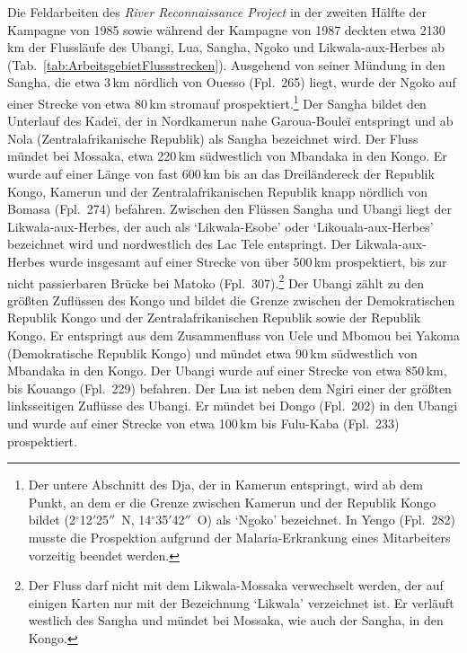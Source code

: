 \begin{multicols}{2}
Die Feldarbeiten des \textit{River Reconnaissance Project} in der zweiten Hälfte der Kampagne von 1985 sowie während der Kampagne von 1987 deckten etwa 2130\,km der Flussläufe des \mbox{Ubangi}, Lua, \mbox{Sangha}, \mbox{Ngoko} und \mbox{Likwala}-\mbox{aux}-\mbox{Herbes} ab (Tab.~\ref{tab:ArbeitsgebietFlussstrecken}). Ausgehend von seiner Mündung in den \mbox{Sangha}, die etwa 3\,km nördlich von Ouesso (Fpl.~265) liegt, wurde der \mbox{Ngoko} auf einer Strecke von etwa 80\,km stromauf prospektiert.\footnote{Der untere Abschnitt des Dja, der in Kamerun entspringt, wird ab dem Punkt, an dem er die Grenze zwischen Kamerun und der Republik Kongo bildet (2$^\circ$12$'$25$''$~N, 14$^\circ$35$'$42$''$~O) als \enquote*{\mbox{Ngoko}} bezeichnet. In Yengo (Fpl.~282) musste die Prospektion aufgrund der Malaria-Erkrankung eines Mitarbeiters vorzeitig beendet werden.\label{ftn:DjaNgoko}} Der \mbox{Sangha} bildet den Unterlauf des Kadeï, der in Nordkamerun nahe Garoua-Bouleï entspringt und ab Nola (Zentralafrikanische Republik) als \mbox{Sangha} bezeichnet wird. Der Fluss mündet bei Mossaka, etwa 220\,km südwestlich von Mbandaka in den Kongo. Er wurde auf einer Länge von fast 600\,km bis an das Dreiländereck der Republik Kongo, Kamerun und der Zentralafrikanischen Republik knapp nördlich von Bomasa (Fpl.~274) befahren. Zwischen den Flüssen \mbox{Sangha} und \mbox{Ubangi} liegt der Likwala-aux-Herbes, der auch als \enquote*{Likwala-Esobe} oder \enquote*{Likouala-aux-Herbes} bezeichnet wird und nordwestlich des Lac Tele entspringt. Der \mbox{Likwala}-\mbox{aux}-\mbox{Herbes} wurde insgesamt auf einer Strecke von über 500\,km prospektiert, bis zur nicht passierbaren Brücke bei Matoko (Fpl.~307).\footnote{Der Fluss darf nicht mit dem Likwala-Mossaka verwechselt werden, der auf einigen Karten nur mit der Bezeichnung \enquote*{Likwala} verzeichnet ist. Er verläuft westlich des \mbox{Sangha} und mündet bei Mossaka, wie auch der \mbox{Sangha}, in den Kongo.} Der \mbox{Ubangi} zählt zu den größten Zuflüssen des Kongo und bildet die Grenze zwischen der Demokratischen Republik Kongo und der Zentralafrikanischen Republik sowie der Republik Kongo. Er entspringt aus dem Zusammenfluss von Uele und Mbomou bei Yakoma (Demokratische Republik Kongo) und mündet etwa 90\,km südwestlich von Mbandaka in den Kongo. Der \mbox{Ubangi} wurde auf einer Strecke von etwa 850\,km, bis Kouango (Fpl.~229) befahren. Der Lua ist neben dem Ngiri einer der größten linksseitigen Zuflüsse des \mbox{Ubangi}. Er mündet bei Dongo (Fpl.~202) in den \mbox{Ubangi} und wurde auf einer Strecke von etwa 100\,km bis Fulu-Kaba (Fpl.~233) prospektiert.


\end{multicols}
